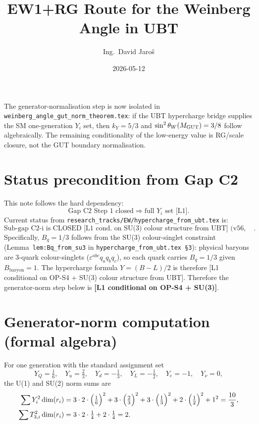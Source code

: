 \documentclass[12pt,a4paper]{article}
\title{EW1+RG Route for the Weinberg Angle in UBT}
\author{Ing.\ David Jaroš}
\date{2026-05-12}
\begin{document}
\maketitle

\begin{tcolorbox}[title={2026-06-13 update — GUT boundary theorem}]
The generator-normalisation step is now isolated in
\texttt{weinberg\_angle\_gut\_norm\_theorem.tex}: if the UBT hypercharge
bridge supplies the SM one-generation $Y_i$ set, then $k_Y=5/3$ and
$\sin^2\theta_W(M_{\rm GUT})=3/8$ follow algebraically.  The remaining
conditionality of the low-energy value is RG/scale closure, not the GUT boundary
normalisation.
\end{tcolorbox}

\section{Status precondition from Gap C2}
This note follows the hard dependency:
\[
\text{Gap C2 Step 1 closed} \Longrightarrow \text{full }Y_i\text{ set [L1]}.
\]
Current status from
\texttt{research\_tracks/EW/hypercharge\_from\_ubt.tex} is:
\[
\text{Sub-gap C2-i is CLOSED [L1 cond. on SU(3) colour structure from UBT]\ (v56, 2026-06-11)}.
\]
Specifically, $B_q=1/3$ follows from the SU(3) colour-singlet constraint
(Lemma~\texttt{lem:Bq\_from\_su3} in \texttt{hypercharge\_from\_ubt.tex §3}):
physical baryons are 3-quark colour-singlets ($\varepsilon^{abc}q_aq_bq_c$),
so each quark carries $B_q=1/3$ given $B_{\mathrm{baryon}}=1$.
The hypercharge formula $Y=(B{-}L)/2$ is therefore
[L1 conditional on OP-S4 + SU(3) colour structure from UBT].
Therefore the generator-norm step below is \textbf{[L1 conditional on OP-S4 + SU(3)]}.

\section{Generator-norm computation (formal algebra)}
For one generation with the standard assignment set
\[
Y_Q=\tfrac16,\quad Y_u=\tfrac23,\quad Y_d=-\tfrac13,\quad
Y_L=-\tfrac12,\quad Y_e=-1,\quad Y_\nu=0,
\]
the U(1) and SU(2) norm sums are
\begin{align}
\sum Y_i^2 \dim(r_i)
&= 3\cdot 2\cdot\Bigl(\tfrac16\Bigr)^2
 +3\cdot\Bigl(\tfrac23\Bigr)^2
 +3\cdot\Bigl(\tfrac13\Bigr)^2
 +2\cdot\Bigl(\tfrac12\Bigr)^2
 +1^2
= \frac{10}{3},\\
\sum T_{3,i}^2 \dim(r_i)
&= 3\cdot 2\cdot\tfrac14 + 2\cdot\tfrac14 = 2.
\end{align}
\end{document}
